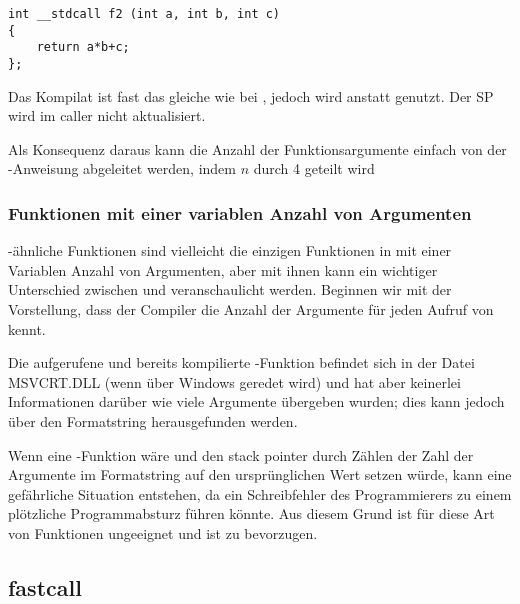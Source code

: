 \begin{lstlisting}
int __stdcall f2 (int a, int b, int c)
{
	return a*b+c;
};
\end{lstlisting}

Das Kompilat ist fast das gleiche wie bei ,
jedoch wird  anstatt  genutzt. Der \ac{SP} wird im \gls{caller} nicht
aktualisiert.

Als Konsequenz daraus kann die Anzahl der Funktionsargumente einfach von der -Anweisung
abgeleitet werden, indem $n$ durch 4 geteilt wird

%


\subsubsection{Funktionen mit einer variablen Anzahl von Argumenten}

\printf-ähnliche Funktionen sind vielleicht die einzigen Funktionen in \CCpp mit einer Variablen
Anzahl von Argumenten, aber mit ihnen kann ein wichtiger Unterschied zwischen  und
 veranschaulicht werden.
Beginnen wir mit der Vorstellung, dass der Compiler die Anzahl der Argumente für jeden Aufruf
von \printf kennt.

Die aufgerufene und bereits kompilierte \printf-Funktion befindet sich in der Datei MSVCRT.DLL
(wenn über Windows geredet wird) und hat aber keinerlei Informationen darüber wie viele Argumente
übergeben wurden; dies kann jedoch über den Formatstring herausgefunden werden.

Wenn \printf eine -Funktion wäre und den \gls{stack pointer} durch Zählen der Zahl
der Argumente im Formatstring auf den ursprünglichen Wert setzen würde, kann eine gefährliche
Situation entstehen, da ein Schreibfehler des Programmierers zu einem plötzliche Programmabsturz
führen könnte.
Aus diesem Grund ist für diese Art von Funktionen  ungeeignet und  ist
zu bevorzugen.

\subsection{fastcall}
\label{fastcall}

